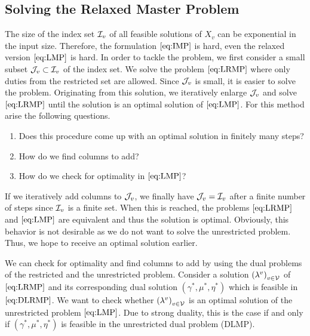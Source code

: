 
\subsection{Solving the Relaxed Master Problem}

The size of the index set $\mathcal{I}_v$ of all feasible solutions of $X_v$ can be exponential in the input size. Therefore, the formulation $\eqref{eq:IMP}$ is hard, even the relaxed version $\eqref{eq:LMP}$ is hard. In order to tackle the problem, we first consider a small subset $\mathcal{J}_v\subset\mathcal{I}_v$ of the index set. We solve the problem $\eqref{eq:LRMP}$ where only duties from the restricted set are allowed. Since $\mathcal{J}_v$ is small, it is easier to solve the problem. Originating from this solution, we iteratively enlarge $\mathcal{J}_v$ and solve $\eqref{eq:LRMP}$ until the solution is an optimal solution of $\eqref{eq:LMP}$. For this method arise the following questions.
\begin{enumerate}
	\item{Does this procedure come up with an optimal solution in finitely many steps?}
	\item{How do we find columns to add?}
	\item{How do we check for optimality in $\eqref{eq:LMP}$?}
\end{enumerate}

If we iteratively add columns to $\mathcal{J}_v$, we finally have $\mathcal{J}_v=\mathcal{I}_v$ after a finite number of steps since $\mathcal{I}_v$ is a finite set. When this is reached, the problems $\eqref{eq:LRMP}$ and $\eqref{eq:LMP}$ are equivalent and thus the solution is optimal. Obviously, this behavior is not desirable as we do not want to solve the unrestricted problem. Thus, we hope to receive an optimal solution earlier.

We can check for optimality and find columns to add by using the dual problems of the restricted and the unrestricted problem. Consider a solution $\left(\lambda^v\right)_{v\in\mathcal{V}}$ of $\eqref{eq:LRMP}$ and its corresponding dual solution $\left(\gamma^*,\mu^*,\eta^*\right)$ which is feasible in $\eqref{eq:DLRMP}$. We want to check whether $\left(\lambda^v\right)_{v\in\mathcal{V}}$ is an optimal solution of the unrestricted problem $\eqref{eq:LMP}$. Due to strong duality, this is the case if and only if $\left(\gamma^*,\mu^*,\eta^*\right)$ is feasible in the unrestricted dual problem (DLMP).

